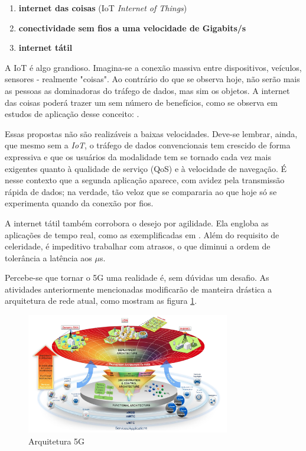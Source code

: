 \begin{enumerate}
\item \textbf{internet das coisas} (IoT \textit{Internet of Things})  
\item \textbf{conectividade sem fios a uma velocidade de Gigabits/s}
\item \textbf{internet tátil}
\end{enumerate} 

A IoT é algo grandioso. Imagina-se a conexão massiva entre dispositivos, veículos, sensores - realmente "coisas". Ao contrário do que se observa hoje, não serão mais as pessoas as dominadoras do tráfego de dados, mas sim os objetos. A internet das coisas poderá trazer um sem número de benefícios, como se observa em estudos de aplicação desse conceito: \cite{Prouski} \cite{Saha} \cite{Hlaing}. 
\par Essas propostas não são realizáveis a baixas velocidades. Deve-se lembrar, ainda, que mesmo sem a \textit{IoT}, o tráfego de dados convencionais tem crescido de forma expressiva e que os usuários da modalidade tem se tornado cada vez mais exigentes quanto à qualidade de serviço (QoS) e à velocidade de navegação. É nesse contexto que a segunda aplicação aparece, com avidez pela transmissão rápida de dados; na verdade, tão veloz que se compararia ao que hoje só se experimenta quando da conexão por fios. 
\par A internet tátil também corrobora o desejo por agilidade. Ela engloba as aplicações de tempo real, como as exemplificadas em \cite{Fettweis1}. Além do requisito de celeridade, é impeditivo trabalhar com atrasos, o que diminui a ordem de tolerância a latência aos $\mu$s. 
\par Percebe-se que tornar o 5G uma realidade é, sem dúvidas um desafio. As atividades anteriormente mencionadas modificarão de manteira drástica a arquitetura de rede atual, como mostram as figura \ref{Figura_arquitetura_atual}. 

\begin{figure}[h!]
\centering
\includegraphics[width=3.5in]{Figura_arquitetura}
\caption{Arquitetura 5G \cite{MetisD28}}
\label{Figura_arquitetura_atual}
\end{figure}

